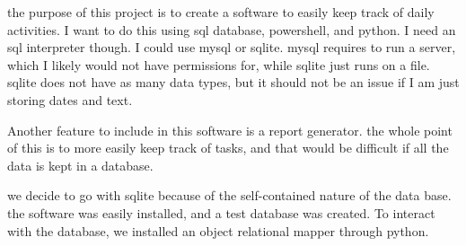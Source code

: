 the purpose of this project is to create a software to easily keep track of daily activities. I want to do this using sql database, powershell, and python. I need an sql interpreter though. I could use mysql or sqlite. mysql requires to run a server, which I likely would not have permissions for, while sqlite just runs on a file. sqlite does not have as many data types, but it should not be an issue if I am just storing dates and text.

Another feature to include in this software is a report generator. the whole point of this is to more easily keep track of tasks, and that would be difficult if all the data is kept in a database.

we decide to go with sqlite because of the self-contained nature of the data base. the software was easily installed, and a test database was created. To interact with the database, we installed an object relational mapper through python.